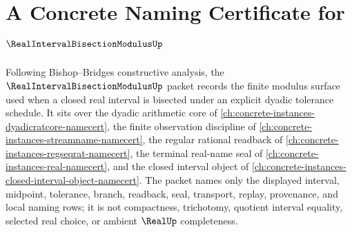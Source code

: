 \chapter{A Concrete Naming Certificate for $\RealIntervalBisectionModulusUp$}
\label{ch:concrete-instances-real-interval-bisection-modulus-namecert}

Following Bishop--Bridges constructive analysis, the $\RealIntervalBisectionModulusUp$ packet records the finite modulus surface used when a closed real interval is bisected under an explicit dyadic tolerance schedule. It sits over the dyadic arithmetic core of \autoref{ch:concrete-instances-dyadicratcore-namecert}, the finite observation discipline of \autoref{ch:concrete-instances-streamname-namecert}, the regular rational readback of \autoref{ch:concrete-instances-regseqrat-namecert}, the terminal real-name seal of \autoref{ch:concrete-instances-real-namecert}, and the closed interval object of \autoref{ch:concrete-instances-closed-interval-object-namecert}. The packet names only the displayed interval, midpoint, tolerance, branch, readback, seal, transport, replay, provenance, and local naming rows; it is not compactness, trichotomy, quotient interval equality, selected real choice, or ambient $\RealUp$ completeness.


